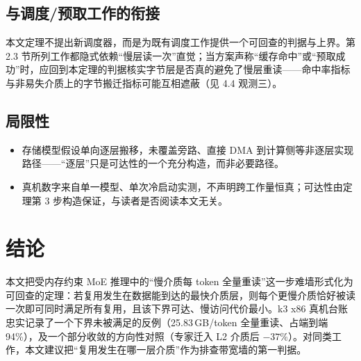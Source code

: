\documentclass[11pt]{ctexart}
\begin{document}
\subsection{与调度/预取工作的衔接}

本文定理不提出新调度器，而是为既有调度工作提供一个可回查的判据与上界。第 2.3 节所列工作\cite{paged,flightllm,cxlspeckv,fastkv}都隐式依赖“慢层读一次”直觉；当方案声称“缓存命中”或“预取成功”时，应回到本定理的判据核实字节层是否真的避免了慢层重读——命中率指标与非易失介质上的字节搬迁指标可能互相遮蔽（见 4.4 观测三）。

\subsection{局限性}

\begin{itemize}
\item 存储模型假设单向逐层搬移，未覆盖旁路、直接 DMA 到计算侧等非逐层实现路径——“逐层”只是可达性的一个充分构造，而非必要路径。
\item 真机数字来自单一模型、单次冷启动实测，不声明跨工作量恒真；可达性由定理第 3 步构造保证，与读者是否阅读本文无关。
\end{itemize}

\section{结论}

本文把受内存约束 MoE 推理中的“慢介质每 token 全量重读”这一步难墙形式化为可回查的定理：若复用发生在数据能到达的最快介质层，则每个更慢介质恰好被读一次即可同时满足所有复用，且该下界可达、慢访问代价最小。k3 x86 真机台账忠实记录了一个下界未被满足的反例（25.83\,GB/token 全量重读、占端到端 94\%），及一个部分收敛的方向性对照（专家迁入 L2 介质后 $-37\%$）。对同类工作，本文建议把“复用发生在哪一层介质”作为排查带宽墙的第一判据。
\end{document}
